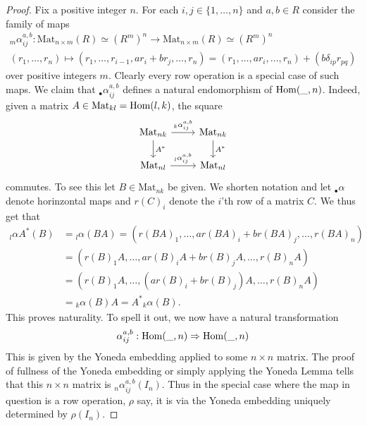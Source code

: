 \begin{proof}
    Fix a positive integer $n$. For each $i,j\in\{ 1,\dots,n\}$ and $a,b\in R$ consider the family of maps 
    \begin{gather*}
        {_m}\alpha_{ij}^{a,b}: \mathrm{Mat}_{n\times m}(R) \simeq (R^m)^n \rightarrow \mathrm{Mat}_{n\times m}(R)\simeq (R^m)^n\\
        (r_1,\dots,r_n) \mapsto (r_1,\dots,r_{i-1}, ar_i+b r_j,\dots,r_n) = (r_1,\dots,ar_i,\dots,r_n) + (b\delta_{ip}r_{pq}) 
    \end{gather*}
    over positive integers $m$. Clearly every row operation is a special case of such maps. We claim that ${_\bullet}\alpha_{ij}^{a,b}$ defines a natural endomorphism of $\mathrm{Hom}(\_,n)$. Indeed, given a matrix $A\in \mathrm{Mat}_{kl}=\mathrm{Hom}(l,k)$, the square 
    $$
        \begin{tikzcd}
            \mathrm{Mat}_{nk} \arrow[r,"{_k}\alpha_{ij}^{a{,}b}"]\arrow[d,"A^\ast"] & \mathrm{Mat}_{nk}\arrow[d,"A^\ast"]\\
            \mathrm{Mat}_{nl} \arrow[r, "{_l}\alpha^{a{,}b}_{ij}"] & \mathrm{Mat}_{nl}
        \end{tikzcd}
    $$
    commutes. To see this let $B\in \mathrm{Mat}_{nk}$ be given. We shorten notation and let ${_\bullet}\alpha$ denote horinzontal maps and $r(C)_i$ denote the $i$'th row of a matrix $C$. We thus get that 
    \begin{align*}
        {_l}\alpha A^\ast(B)&={_l}\alpha(BA)= (r(BA)_1,\dots, ar(BA)_i+br(BA)_j,\dots, r(BA)_n)\\
        &= (r(B)_1A,\dots, ar(B)_iA+br(B)_jA,\dots, r(B)_nA)\\
        &= (r(B)_1A,\dots, (ar(B)_i+br(B)_j)A,\dots, r(B)_nA)\\
        &= {_k}\alpha(B)A = A^\ast {_k}\alpha(B).    
    \end{align*}
    This proves naturality. To spell it out, we now have a natural transformation 
    $$
        \alpha_{ij}^{a,b}: \mathrm{Hom}(\_,n) \Rightarrow \mathrm{Hom}(\_,n)
    $$ 
    This is given by the Yoneda embedding applied to some $n\times n$ matrix. The proof of fullness of the Yoneda embedding or simply applying the Yoneda Lemma tells that this $n\times n$ matrix is ${_n}\alpha_{ij}^{a,b}(I_n)$. Thus in the special case where the map in question is a row operation, $\rho$ say, it is via the Yoneda embedding uniquely determined by $\rho(I_n)$.   
\end{proof}
